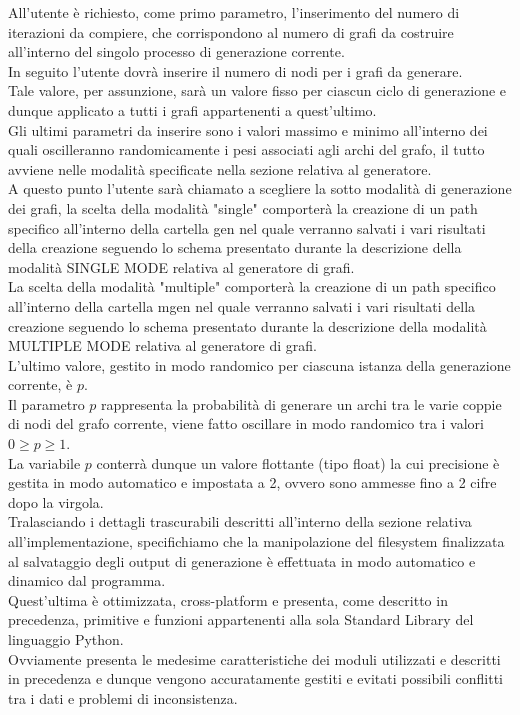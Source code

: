 All'utente è richiesto, come primo parametro, l'inserimento del numero di iterazioni da compiere, che corrispondono al numero di grafi da costruire all'interno del singolo processo di generazione corrente.\\

In seguito l'utente dovrà inserire il numero di nodi per i grafi da generare.\\
Tale valore, per assunzione, sarà un valore fisso per ciascun ciclo di generazione e dunque applicato a tutti i grafi appartenenti a quest'ultimo.\\

Gli ultimi parametri da inserire sono i valori massimo e minimo all'interno dei quali oscilleranno randomicamente i pesi associati agli archi del grafo, il tutto avviene nelle modalità specificate nella sezione relativa al generatore.\\

A questo punto l'utente sarà chiamato a scegliere la sotto modalità di generazione dei grafi, la scelta della modalità "single" comporterà la creazione di un path specifico all'interno della cartella gen nel quale verranno salvati i vari risultati della creazione seguendo lo schema presentato durante la descrizione della modalità SINGLE MODE relativa al generatore di grafi.\\
La scelta della modalità "multiple" comporterà la creazione di un path specifico all'interno della cartella mgen nel quale verranno salvati i vari risultati della creazione seguendo lo schema presentato durante la descrizione della modalità MULTIPLE MODE relativa al generatore di grafi. \\

L'ultimo valore, gestito in modo randomico per ciascuna istanza della generazione corrente, è $p$.\\
Il parametro $p$ rappresenta la probabilità di generare un archi tra le varie coppie di nodi del grafo corrente, viene fatto oscillare in modo randomico tra i valori \(0 \geq p \geq 1\).\\
La variabile $p$ conterrà dunque un valore flottante (tipo float) la cui precisione è gestita in modo automatico e impostata a 2, ovvero sono ammesse fino a 2 cifre dopo la virgola.\\

Tralasciando i dettagli trascurabili descritti all'interno della sezione relativa all'implementazione, specifichiamo che la manipolazione del filesystem finalizzata al salvataggio degli output di generazione è effettuata in modo automatico e dinamico dal programma.\\
Quest'ultima è ottimizzata, cross-platform e presenta, come descritto in precedenza, primitive e funzioni appartenenti alla sola Standard Library del linguaggio Python.\\
Ovviamente presenta le medesime caratteristiche dei moduli utilizzati e descritti in precedenza e dunque vengono accuratamente gestiti e evitati possibili conflitti tra i dati e problemi di inconsistenza.\\

